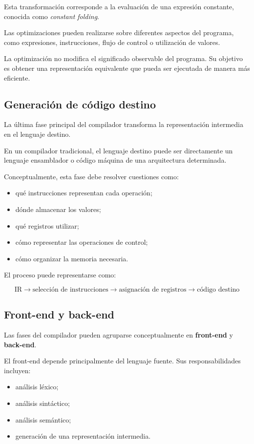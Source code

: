 \documentclass[11pt,a4paper]{article}
\begin{document}
Esta transformación corresponde a la evaluación de una expresión constante,
conocida como \textit{constant folding}.

Las optimizaciones pueden realizarse sobre diferentes aspectos del programa,
como expresiones, instrucciones, flujo de control o utilización de valores.

La optimización no modifica el significado observable del programa. Su
objetivo es obtener una representación equivalente que pueda ser ejecutada
de manera más eficiente.

\subsection{Generación de código destino}

La última fase principal del compilador transforma la representación
intermedia en el lenguaje destino.

En un compilador tradicional, el lenguaje destino puede ser directamente un
lenguaje ensamblador o código máquina de una arquitectura determinada.

Conceptualmente, esta fase debe resolver cuestiones como:

\begin{itemize}
    \item qué instrucciones representan cada operación;
    \item dónde almacenar los valores;
    \item qué registros utilizar;
    \item cómo representar las operaciones de control;
    \item cómo organizar la memoria necesaria.
\end{itemize}

El proceso puede representarse como:

\[
\text{IR}
\rightarrow
\text{selección de instrucciones}
\rightarrow
\text{asignación de registros}
\rightarrow
\text{código destino}
\]

\subsection{Front-end y back-end}

Las fases del compilador pueden agruparse conceptualmente en
\textbf{front-end} y \textbf{back-end}.

El front-end depende principalmente del lenguaje fuente. Sus
responsabilidades incluyen:

\begin{itemize}
    \item análisis léxico;
    \item análisis sintáctico;
    \item análisis semántico;
    \item generación de una representación intermedia.
\end{itemize}
\end{document}
